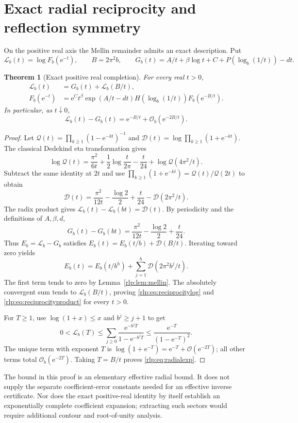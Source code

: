 \documentclass[11pt,letterpaper]{article}
\numberwithin{equation}{section}
\newtheorem{theorem}{Theorem}[section]
\theoremstyle{remark}\newtheorem{remark}[theorem]{Remark}
\newcommand{\ee}{\mathrm e}
\newcommand{\Ord}{\mathcal O}
\begin{document}
\section{Exact radial reciprocity and reflection symmetry}
\label{rlp:sec:reciprocity}
On the positive real axis the Mellin remainder admits an exact description. Put
\[
 \mathcal L_b(t)=\log F_b(\ee^{-t}),\qquad B=2\pi^2b,\qquad
 G_b(t)=A/t+\beta\log t+C+P(\log_b(1/t))-dt.
\]
\begin{theorem}[Exact positive real completion]\label{rlp:thm:reciprocity}
For every real $t>0$,
\begin{align}
 \mathcal L_b(t)&=G_b(t)+\mathcal L_b(B/t),\label{rlp:eq:reciprocitylog}\\
 F_b(\ee^{-t})&=\ee^C t^\beta\exp(A/t-dt)
 H(\log_b(1/t))F_b(\ee^{-B/t}).\label{rlp:eq:reciprocityproduct}
\end{align}
In particular, as $t\downarrow0$,
\begin{equation}\label{rlp:eq:radialexp}
 \mathcal L_b(t)-G_b(t)=\ee^{-B/t}+\Ord_b(\ee^{-2B/t}).
\end{equation}
\end{theorem}
\begin{proof}
Let $\mathcal Q(t)=\prod_{k\ge1}(1-\ee^{-kt})^{-1}$ and
$\mathcal D(t)=\log\prod_{k\ge1}(1+\ee^{-kt})$.
The classical Dedekind eta transformation \cite[\S\S23.18, 27.14]{dlmf} gives
\[
 \log\mathcal Q(t)=\frac{\pi^2}{6t}
 +\frac12\log\frac{t}{2\pi}-\frac t{24}
 +\log\mathcal Q(4\pi^2/t).
\]
Subtract the same identity at $2t$ and use
$\prod_{k\ge1}(1+\ee^{-kt})=\mathcal Q(t)/\mathcal Q(2t)$ to obtain
\begin{equation}\label{rlp:eq:distincteta}
 \mathcal D(t)=\frac{\pi^2}{12t}-\frac{\log2}{2}
 +\frac t{24}-\mathcal D(2\pi^2/t).
\end{equation}
The radix product gives
$\mathcal L_b(t)-\mathcal L_b(bt)=\mathcal D(t)$.
By periodicity and the definitions of $A,\beta,d$,
\[
 G_b(t)-G_b(bt)=\frac{\pi^2}{12t}-\frac{\log2}{2}+\frac t{24}.
\]
Thus $E_b=\mathcal L_b-G_b$ satisfies
$E_b(t)=E_b(t/b)+\mathcal D(B/t)$. Iterating toward zero yields
\[
 E_b(t)=E_b(t/b^h)+\sum_{j=1}^h\mathcal D(2\pi^2b^j/t).
\]
The first term tends to zero by Lemma~\ref{rlp:lem:mellin}. The absolutely convergent sum tends to $\mathcal L_b(B/t)$, proving \eqref{rlp:eq:reciprocitylog} and \eqref{rlp:eq:reciprocityproduct} for every $t>0$.

For $T\ge1$, use $\log(1+x)\le x$ and $b^j\ge j+1$ to get
\[
 0<\mathcal L_b(T)
 \le\sum_{j\ge0}\frac{\ee^{-b^jT}}{1-\ee^{-b^jT}}
 \le\frac{\ee^{-T}}{(1-\ee^{-T})^2}.
\]
The unique term with exponent $T$ is
$\log(1+\ee^{-T})=\ee^{-T}+\Ord(\ee^{-2T})$; all other terms total $\Ord_b(\ee^{-2T})$. Taking $T=B/t$ proves \eqref{rlp:eq:radialexp}.
\end{proof}
The bound in this proof is an elementary effective radial bound. It does not supply the separate coefficient-error constants needed for an effective inverse certificate. Nor does the exact positive-real identity by itself establish an exponentially complete coefficient expansion; extracting such sectors would require additional contour and root-of-unity analysis.
\end{document}
